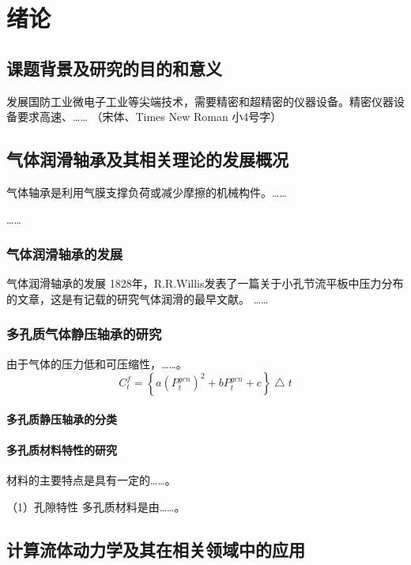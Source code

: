\setcounter{page}{1} %

\chapter{绪论} %

\section{课题背景及研究的目的和意义} %

发展国防工业微电子工业等尖端技术，需要精密和超精密的仪器设备。精密仪器设备要求高速、…… （宋体、Times New Roman 小4号字）


\section{气体润滑轴承及其相关理论的发展概况} %
气体轴承是利用气膜支撑负荷或减少摩擦的机械构件。……

…… 
\subsection{气体润滑轴承的发展} %

气体润滑轴承的发展
1828年，R.R.Willis发表了一篇关于小孔节流平板中压力分布的文章，这是有记载的研究气体润滑的最早文献。
…… 
\subsection{多孔质气体静压轴承的研究} 
由于气体的压力低和可压缩性，……。
\begin{equation}
\label{gt1}
 C^f_t=\left \{a(P_t^{gen})^2 + b P_t^{gen}+c\right \} \bigtriangleup t
\end{equation}
\subsubsection{多孔质静压轴承的分类}


\subsubsection{多孔质材料特性的研究}
材料的主要特点是具有一定的……。

{\Heiti （1）孔隙特性} 多孔质材料是由……。



\section{计算流体动力学及其在相关领域中的应用}

